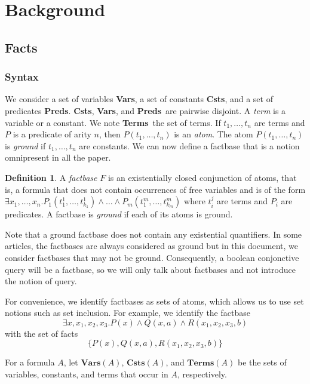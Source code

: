 \documentclass{article}
\theoremstyle{definition}
\newtheorem{definition}{Definition}[section]
\theoremstyle{remark}
\newcommand{\Vars}{\textbf{Vars}}
\newcommand{\Terms}{\textbf{Terms}}
\newcommand{\Preds}{\textbf{Preds}}
\newcommand{\Csts}{\textbf{Csts}}
\begin{document}
\section{Background}


\subsection{Facts}

\subsubsection{Syntax}

We consider a set of variables \Vars, a set of constants \Csts, and a set of predicates \Preds. \Csts, \Vars, and \Preds\ are pairwise disjoint. A \emph{term} is a variable or a constant. We note \Terms\ the set of terms. If $t_1,\ldots,t_n$ are terms and $P$ is a predicate of arity $n$, then $P(t_{1},\ldots,t_{n})$ is an \emph{atom}. The atom $P(t_{1},\ldots,t_{n})$ is \emph{ground} if $t_1,\ldots,t_n$ are constants. We can now define a factbase that is a notion omnipresent in all the paper.  


\begin{definition}
A \emph{factbase} $F$ is an existentially closed conjunction of atoms, that is, a formula that does not contain occurrences of free variables and is of the form $\exists x_{1},\ldots,x_{n}.P_{1}(t_{1}^{1},\ldots,t_{k_{1}}^{1})\land \ldots\land P_{m}(t_{1}^{m},\ldots,t_{k_{m}}^{m})$ where $t_i^j$ are terms and $P_i$ are predicates. A factbase is \emph{ground} if each of its atoms is ground.
\end{definition}

Note that a ground factbase does not contain any  existential quantifiers. In some articles, the factbases are always considered as ground but in this document, we consider factbases that may not be ground. Consequently, a  boolean conjonctive query will be a factbase, so we will only talk about factbases and not introduce the notion of query.

For convenience, we identify factbases as sets of atoms, which allows us to  use  set  notions  such  as  set inclusion. For example, we identify the factbase $$\exists x,x_{1},x_{2},x_{3}. P(x) \land Q(x,a) \land R(x_{1},x_{2},x_{3},b)$$ with the set of facts $$\{P(x),Q(x,a),R(x_{1},x_{2},x_{3},b)\}$$

For a formula $A$, let \emph{$\Vars(A)$}, \emph{$\Csts(A)$}, and \emph{$\Terms(A)$} be the sets of variables, constants, and terms that occur in $A$, respectively.
\end{document}
